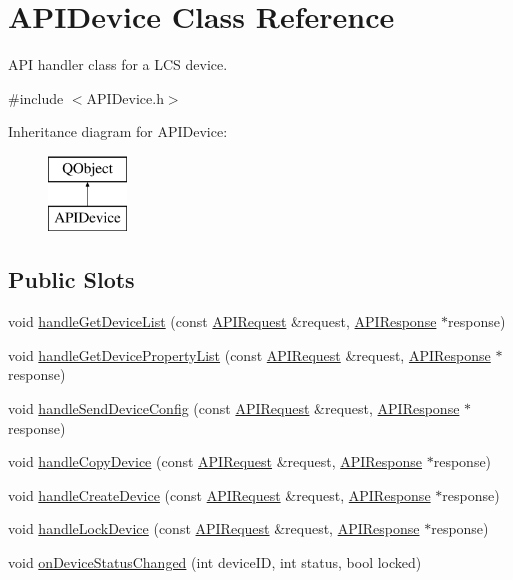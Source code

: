\hypertarget{class_a_p_i_device}{}\section{A\+P\+I\+Device Class Reference}
\label{class_a_p_i_device}


A\+PI handler class for a L\+CS device.  




{\ttfamily \#include $<$A\+P\+I\+Device.\+h$>$}

Inheritance diagram for A\+P\+I\+Device\+:\begin{figure}[H]
\begin{center}
\leavevmode
\includegraphics[height=2.000000cm]{class_a_p_i_device}
\end{center}
\end{figure}
\subsection*{Public Slots}
\begin{DoxyCompactItemize}
\item 
void \hyperlink{class_a_p_i_device_a1e74a10d605557654fe5be02a9db87ab}{handle\+Get\+Device\+List} (const \hyperlink{class_a_p_i_request}{A\+P\+I\+Request} \&request, \hyperlink{class_a_p_i_response}{A\+P\+I\+Response} $\ast$response)
\item 
void \hyperlink{class_a_p_i_device_a5be87488af611d8ef61501a07e4a39d9}{handle\+Get\+Device\+Property\+List} (const \hyperlink{class_a_p_i_request}{A\+P\+I\+Request} \&request, \hyperlink{class_a_p_i_response}{A\+P\+I\+Response} $\ast$response)
\item 
void \hyperlink{class_a_p_i_device_a794458df71d6f24a8b8dccbbdf9235da}{handle\+Send\+Device\+Config} (const \hyperlink{class_a_p_i_request}{A\+P\+I\+Request} \&request, \hyperlink{class_a_p_i_response}{A\+P\+I\+Response} $\ast$response)
\item 
void \hyperlink{class_a_p_i_device_ab3151ab616a5ae04f1aa157d24e8f511}{handle\+Copy\+Device} (const \hyperlink{class_a_p_i_request}{A\+P\+I\+Request} \&request, \hyperlink{class_a_p_i_response}{A\+P\+I\+Response} $\ast$response)
\item 
void \hyperlink{class_a_p_i_device_aabc5cc49832ebe6779cf70c1b38ad4c9}{handle\+Create\+Device} (const \hyperlink{class_a_p_i_request}{A\+P\+I\+Request} \&request, \hyperlink{class_a_p_i_response}{A\+P\+I\+Response} $\ast$response)
\item 
void \hyperlink{class_a_p_i_device_a9fa95a9f88e738477ed5e32e22ae6990}{handle\+Lock\+Device} (const \hyperlink{class_a_p_i_request}{A\+P\+I\+Request} \&request, \hyperlink{class_a_p_i_response}{A\+P\+I\+Response} $\ast$response)
\item 
void \hyperlink{class_a_p_i_device_a4424a0e2b44177c7b3af3b9fd9aca875}{on\+Device\+Status\+Changed} (int device\+ID, int status, bool locked)
\end{DoxyCompactItemize}
